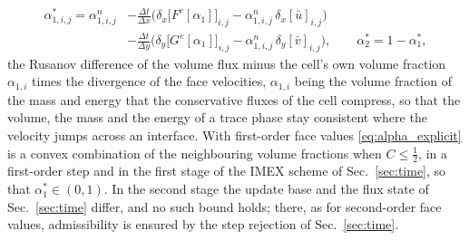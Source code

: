 \begin{equation}
\begin{aligned}
\alpha^*_{1,i,j}=\alpha^n_{1,i,j}&-\frac{\Delta t}{\Delta x}\Big(\delta_x\big[F^e[\alpha_1]\big]_{i,j}-\alpha^n_{1,i,j}\,\delta_x[\bar u]_{i,j}\Big)\\
&-\frac{\Delta t}{\Delta y}\Big(\delta_y\big[G^e[\alpha_1]\big]_{i,j}-\alpha^n_{1,i,j}\,\delta_y[\bar v]_{i,j}\Big),\qquad
\alpha^*_2=1-\alpha^*_1 ,
\end{aligned}
\label{eq:alpha_explicit}
\end{equation}
the Rusanov difference of the volume flux minus the cell's own volume fraction $\alpha_{1,i}$ times the divergence of the face
velocities, $\alpha_{1,i}$ being the volume fraction of the mass and energy that the conservative fluxes of the cell compress, so that the volume, the mass and the energy of a
trace phase stay consistent where the velocity jumps across an interface. With first-order face values \eqref{eq:alpha_explicit} is a convex combination of the neighbouring volume
fractions when $C\le\tfrac12$, in a first-order step and in the first stage of the IMEX scheme of Sec.~\ref{sec:time}, so that
$\alpha^*_1\in(0,1)$. In the second stage the update base and the flux state of Sec.~\ref{sec:time} differ, and no
such bound holds; there, as for second-order face values, admissibility is ensured by the step rejection of Sec.~\ref{sec:time}.

